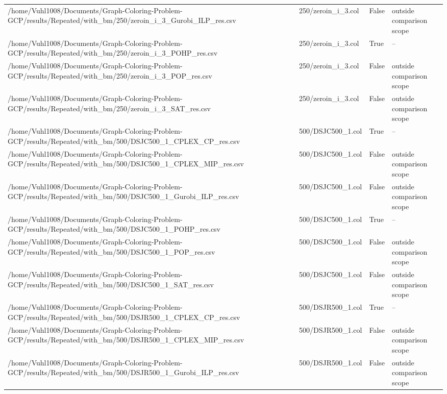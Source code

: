\begin{table}[htbp]
\begin{tabular}{llll}
/home/Vuhl1008/Documents/Graph-Coloring-Problem-GCP/results/Repeated/with\_bm/250/zeroin\_i\_3\_Gurobi\_ILP\_res.csv & 250/zeroin\_i\_3.col & False & outside comparison scope \\
/home/Vuhl1008/Documents/Graph-Coloring-Problem-GCP/results/Repeated/with\_bm/250/zeroin\_i\_3\_POHP\_res.csv & 250/zeroin\_i\_3.col & True & -- \\
/home/Vuhl1008/Documents/Graph-Coloring-Problem-GCP/results/Repeated/with\_bm/250/zeroin\_i\_3\_POP\_res.csv & 250/zeroin\_i\_3.col & False & outside comparison scope \\
/home/Vuhl1008/Documents/Graph-Coloring-Problem-GCP/results/Repeated/with\_bm/250/zeroin\_i\_3\_SAT\_res.csv & 250/zeroin\_i\_3.col & False & outside comparison scope \\
/home/Vuhl1008/Documents/Graph-Coloring-Problem-GCP/results/Repeated/with\_bm/500/DSJC500\_1\_CPLEX\_CP\_res.csv & 500/DSJC500\_1.col & True & -- \\
/home/Vuhl1008/Documents/Graph-Coloring-Problem-GCP/results/Repeated/with\_bm/500/DSJC500\_1\_CPLEX\_MIP\_res.csv & 500/DSJC500\_1.col & False & outside comparison scope \\
/home/Vuhl1008/Documents/Graph-Coloring-Problem-GCP/results/Repeated/with\_bm/500/DSJC500\_1\_Gurobi\_ILP\_res.csv & 500/DSJC500\_1.col & False & outside comparison scope \\
/home/Vuhl1008/Documents/Graph-Coloring-Problem-GCP/results/Repeated/with\_bm/500/DSJC500\_1\_POHP\_res.csv & 500/DSJC500\_1.col & True & -- \\
/home/Vuhl1008/Documents/Graph-Coloring-Problem-GCP/results/Repeated/with\_bm/500/DSJC500\_1\_POP\_res.csv & 500/DSJC500\_1.col & False & outside comparison scope \\
/home/Vuhl1008/Documents/Graph-Coloring-Problem-GCP/results/Repeated/with\_bm/500/DSJC500\_1\_SAT\_res.csv & 500/DSJC500\_1.col & False & outside comparison scope \\
/home/Vuhl1008/Documents/Graph-Coloring-Problem-GCP/results/Repeated/with\_bm/500/DSJR500\_1\_CPLEX\_CP\_res.csv & 500/DSJR500\_1.col & True & -- \\
/home/Vuhl1008/Documents/Graph-Coloring-Problem-GCP/results/Repeated/with\_bm/500/DSJR500\_1\_CPLEX\_MIP\_res.csv & 500/DSJR500\_1.col & False & outside comparison scope \\
/home/Vuhl1008/Documents/Graph-Coloring-Problem-GCP/results/Repeated/with\_bm/500/DSJR500\_1\_Gurobi\_ILP\_res.csv & 500/DSJR500\_1.col & False & outside comparison scope \\

\end{tabular}
\end{table}
